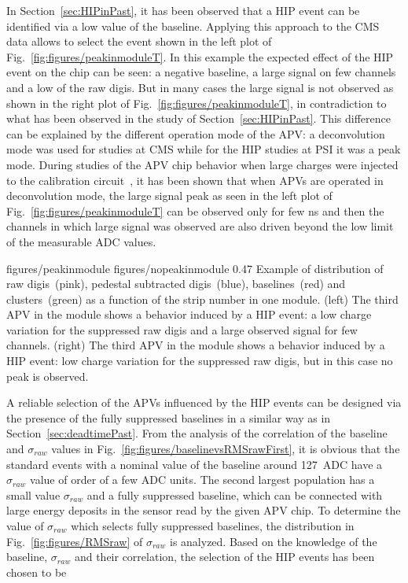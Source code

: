 In Section~\ref{sec:HIPinPast}, it has been observed that a HIP event can be identified via a low value of the baseline. Applying this approach to the CMS data allows to select the event shown in the left plot of Fig.~\ref{fig:figures/peakinmoduleT}. In this example the expected effect of the HIP event on the chip can be seen: a negative baseline, a large signal on few channels and a low \SD of the raw digis. But in many cases the large signal is not observed as shown in the right plot of Fig.~\ref{fig:figures/peakinmoduleT}, in contradiction to what has been observed in the study of Section~\ref{sec:HIPinPast}. This difference can be explained by the different operation mode of the APV: a deconvolution mode was used for studies at CMS while for the HIP studies at PSI it was a peak mode. During studies of the APV chip behavior when large charges were injected to the calibration circuit~\cite{Bainbridge:2002bda}, it has been shown that when APVs are operated in deconvolution mode, the large signal peak as seen in the left plot of Fig.~\ref{fig:figures/peakinmoduleT} can be observed only for few ns and then the channels in which large signal was observed are also driven beyond the low limit of the measurable ADC values. 

                 {figures/peakinmodule} %
                 {figures/nopeakinmodule} %
                 {0.47}       %
                 {Example of distribution of raw digis~(pink), pedestal subtracted digis~(blue), baselines~(red) and clusters~(green) as a function of the strip number in one module. (left) The third APV in the module shows a behavior induced by a HIP event: a low charge variation for the suppressed raw digis and a large observed signal for few channels. (right)  The third APV in the module shows a behavior induced by a HIP event: low charge variation for the suppressed raw digis, but in this case no peak is observed. } %

A reliable selection of the APVs influenced by the HIP events can be designed via the presence of the fully suppressed baselines in a similar way as in Section~\ref{sec:deadtimePast}. From the analysis of the correlation of the baseline and $\sigma_{raw}$ values in Fig.~\ref{fig:figures/baselinevsRMSrawFirst}, it is obvious that the standard events with a nominal value of the baseline around 127~ADC have a $\sigma_{raw}$ value of order of a few ADC units.  The second largest population has a small value $\sigma_{raw}$ and a fully suppressed baseline, which can be connected with large energy deposits in the sensor read by the given APV chip. To determine the value of $\sigma_{raw}$ which selects fully suppressed baselines, the distribution in Fig.~\ref{fig:figures/RMSraw} of $\sigma_{raw}$ is analyzed. Based on the knowledge of the baseline, $\sigma_{raw}$ and their correlation, the selection of the HIP events has been chosen to be 

